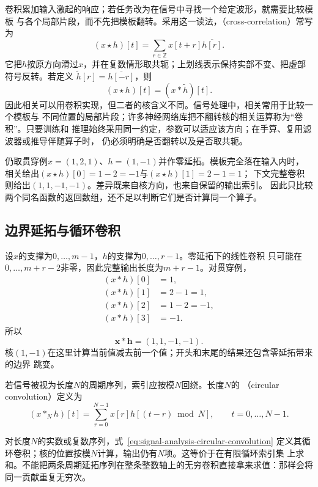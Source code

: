 卷积累加输入激起的响应；若任务改为在信号中寻找一个给定波形，就需要比较模板
与各个局部片段，而不先把模板翻转。采用这一读法，（cross-correlation）常写为
\begin{equation}
  (x\star h)[t]
  =
  \sum_{r\in\mathbb{Z}}x[t+r]\overline{h[r]}.
  \label{eq:signal-analysis-cross-correlation}
\end{equation}
它把$h$按原方向滑过$x$，并在复数情形取共轭；上划线表示保持实部不变、把虚部
符号反转。若定义
$\widetilde{h}[r]=\overline{h[-r]}$，则
\[
  (x\star h)[t]=(x*\widetilde{h})[t].
\]
因此相关可以用卷积实现，但二者的核含义不同。信号处理中，相关常用于比较一个模板与
不同位置的局部片段；许多神经网络库把不翻转核的相关运算称为“卷积”。只要训练和
推理始终采用同一约定，参数可以适应该方向；在手算、复用滤波器或推导伴随算子时，
仍必须明确是否翻转以及是否取共轭。

仍取贯穿例$x=(1,2,1)$、$h=(1,-1)$并作零延拓。模板完全落在输入内时，
相关给出$(x\star h)[0]=1-2=-1$与$(x\star h)[1]=2-1=1$；
下文完整卷积则给出$(1,1,-1,-1)$。差异既来自核方向，也来自保留的输出索引。
因此只比较两个同名函数的返回数组，还不足以判断它们是否计算同一个算子。

\subsection{边界延拓与循环卷积}

设$x$的支撑为$0,\ldots,m-1$，$h$的支撑为$0,\ldots,r-1$。零延拓下的线性卷积
只可能在$0,\ldots,m+r-2$非零，因此完整输出长度为$m+r-1$。对贯穿例，
\begin{align*}
  (x*h)[0]&=1,\\
  (x*h)[1]&=2-1=1,\\
  (x*h)[2]&=1-2=-1,\\
  (x*h)[3]&=-1.
\end{align*}
所以
\begin{equation}
  \bm{x}*\bm{h}=(1,1,-1,-1).
  \label{eq:signal-analysis-running-linear-convolution}
\end{equation}
核$(1,-1)$在这里计算当前值减去前一个值；开头和末尾的结果还包含零延拓带来的边界
跳变。

若信号被视为长度$N$的周期序列，索引应按模$N$回绕。长度$N$的
（circular convolution）定义为
\begin{equation}
  (x*_N h)[t]
  =
  \sum_{r=0}^{N-1}x[r]h[(t-r)\bmod N],
  \qquad t=0,\ldots,N-1.
  \label{eq:signal-analysis-circular-convolution}
\end{equation}
\begin{definition}[循环卷积]
  \label{def:signal-analysis-circular-convolution}
  对长度$N$的实数或复数序列，式~\eqref{eq:signal-analysis-circular-convolution}
  定义其循环卷积；核的位置按模$N$计算，输出仍有$N$项。这等价于在有限循环索引集
  上求和。不能把两条周期延拓序列在整条整数轴上的无穷卷积直接拿来求值：那样会将
  同一贡献重复无穷次。
\end{definition}

